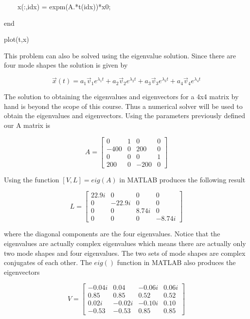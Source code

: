 \begin{enumerate}
\begin{framed}
     ~~~~x(:,idx) = expm(A.*t(idx))*x0; 

     end 

     plot(t,x) 
   \end{framed}

   This problem can also be solved using the eigenvalue
   solution. Since there are four mode shapes the solution is given by 

   \begin{equation}
     \vec{x}(t) = a_1\vec{v}_1e^{\lambda_1 t} +
     a_2\vec{v}_2e^{\lambda_2 t} + a_3\vec{v}_3e^{\lambda_3 t} +
     a_4\vec{v}_4e^{\lambda_4 t}
   \end{equation}

   The solution to obtaining the eigenvalues and eigenvectors for a
   4x4 matrix by hand is beyond the scope of this course. Thus a
   numerical solver will be used to obtain the eigenvalues and
   eigenvectors. Using the parameters previously defined our A
   matrix is
   
   \begin{equation}
     A = \begin{bmatrix} 0 & 1 & 0 & 0 \\ -400 & 0 & 200
       & 0 \\ 0 & 0 & 0 & 1 \\ 200 & 0 & -200 & 0 \end{bmatrix} 
   \end{equation}

   Using the function $[V,L] = eig(A)$ in MATLAB produces the
   following result 

   \begin{equation}
     L = \begin{bmatrix} 22.9i & 0 & 0 & 0 \\ 0 & -22.9i & 0
       & 0 \\ 0 & 0 & 8.74i & 0 \\ 0 & 0 & 0 & -8.74i \end{bmatrix} 
   \end{equation}

   where the diagonal components are the four eigenvalues. Notice that
   the eigenvalues are actually complex eigenvalues which means there
   are actually only two mode shapes and four eigenvalues. The two
   sets of mode shapes are complex conjugates of each other. The
   $eig()$ function in MATLAB also produces the eigenvectors

   \begin{equation}
     V = \begin{bmatrix} -0.04i & 0.04 & -0.06i & 0.06i \\ 0.85 & 0.85 & 0.52
       & 0.52 \\ 0.02i & -0.02i & -0.10i & 0.10 \\ -0.53 & -0.53 & 0.85 & 0.85 \end{bmatrix} 
   \end{equation}
   

\end{enumerate}
